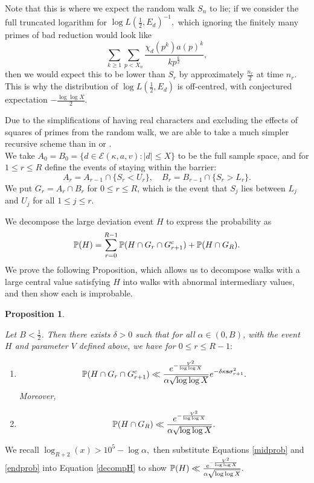 \documentclass[12pt]{amsart}
\def\P{\ensuremath\mathbb{P}}
\numberwithin{equation}{section}
\newtheorem{prop}[thm]{Proposition}
\numberwithin{thm}{section}
\newcommand{\1}{\mathbf 1}
\begin{document}
Note that this is where we expect the random walk $S_{n}$ to lie; if we consider the full truncated logarithm for $\log L(\frac{1}{2},E_d)^{-1},$ which ignoring the finitely many primes of bad reduction would look like $$\sum_{k\ge 1}\sum_{p< X_n}\frac{\chi_d(p^k)a(p)^k}{kp^{\frac{k}{2}}},$$ then we would expect this to be lower than $S_r$  by approximately $\frac{n_r}{2}$ at time $n_r$. This is why the distribution of $\log L(\frac{1}{2},E_d)$ is off-centred, with conjectured expectation $-\frac{\log\log X}{2}.$

Due to the simplifications of having real characters and excluding the effects of squares of primes from the random walk, we are able to take a much simpler recursive scheme than in \cite{AB24} or \cite{AC25}. \\
We take $A_0=B_0=\{d\in \mathcal{E}(\kappa,a,v): |d|\le X\}$ to be the full sample space, and for $1\le r\le R$ define the events of staying within the barrier:
\begin{equation}
	A_r=A_{r-1}\cap\{S_r<U_r \},\quad B_r=B_{r-1}\cap\{S_r>L_r\}.
\end{equation} We put $G_r=A_r\cap B_r$ for $0\le r \le R$, which is the event that $S_j$ lies between $L_j$ and $U_j$ for all $1\le j\le r.$ 

We decompose the large deviation event $H$ to express the probability as
\begin{equation}\label{decompH}
	\P(H)= \sum^{R-1}_{r=0}\P(H\cap G_r\cap G_{r+1}^c)+\P(H\cap G_{R}).
\end{equation}
We prove the following Proposition, which allows us to decompose walks with a large central value satisfying $H$ into walks with abnormal intermediary values, and then show each is improbable.
\begin{prop}\label{barrierprob}


\renewcommand{\theenumi}{\roman{enumi}}
 Let $B<\frac{1}{2}$. Then there exists $\delta>0$ such that for all $\alpha\in (0,B)$, with the event $H$ and parameter $V$ defined above,  we have for $0\le r\le R-1:$ \begin{enumerate}
	\item\begin{equation}\label{midprob}
		\P(H\cap G_r\cap G_{r+1}^c)\ll \frac{e^{-\frac{V^2}{\log\log X}}}{\alpha\sqrt{\log\log X}}e^{-\delta\kappa\mathbf{s}\sigma^2_{r+1}}.
	\end{equation}
	Moreover,
	\item \begin{equation}\label{endprob}
		\P(H\cap G_R)\ll \frac{e^{-\frac{V^2}{\log\log X}}}{\alpha\sqrt{\log\log X}}.
	\end{equation}
\end{enumerate}
\end{prop}
We recall $\log_{R+2}(x)>10^5-\log \alpha,$ then substitute Equations \eqref{midprob} and \eqref{endprob} into Equation \eqref{decompH} to show $\P(H)\ll \frac{e^{-\frac{V^2}{\log\log X}}}{\alpha\sqrt{\log\log X}}.$
\end{document}
